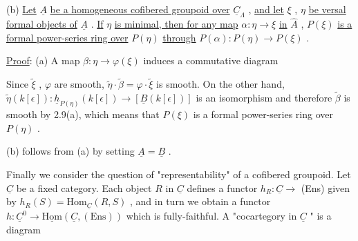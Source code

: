 (b)  \underline{Let} $\underline{A}$ \underline{be a homogeneous cofibered groupoid over} $\underline{C}_{\Lambda}$ , \underline{and let} $\xi$ , $\eta$ \underline{be versal formal objects of} $\underline{A}$ . \underline{If} $\eta$ \underline{is minimal, then for any map} $\alpha : \eta \to \xi$ \underline{in} $\hat{A}$ , $P(\xi)$ \underline{is a formal power-series ring over} $P(\eta)$ \underline{through} $P(\alpha) : P(\eta) \to P(\xi)$ .

\underline{Proof}:  (a)  A map $\beta : \eta \to \varphi(\xi)$ induces a commutative diagram

\begin{center}
\end{center}
Since $\widetilde{\xi}$ , $\varphi$ are smooth, $\widetilde{\eta}\cdot\widetilde{\beta} = \varphi\cdot\widetilde{\xi}$ is smooth. On the other hand,
$\widetilde{\eta}(k[\epsilon]) : \underline{h}_{P(\eta)}(k[\epsilon]) \to [\underline{B}(k[\epsilon])]$ is an isomorphism and therefore $\widetilde{\beta}$ is smooth by 2.9(a), which means that $P(\xi)$ is a formal power-series ring over $P(\eta)$ .

(b)  follows from (a) by setting $\underline{A} = \underline{B}$ .

Finally we consider the question of  "representability"  of a cofibered groupoid. Let $\underline{C}$ be a fixed category. Each object $R$ in $\underline{C}$ defines a functor $h_R : \underline{C} \to$ (Ens)  given by  $h_R(S) = \mathrm{Hom}_{\underline{C}}(R,S)$ , and in turn we obtain a functor $h : \underline{C}^0 \to \underline{\mathrm{Hom}}(\underline{C},(\mathrm{Ens}))$ which is fully-faithful. A  "cocartegory in $\underline{C}$ "  is a diagram

